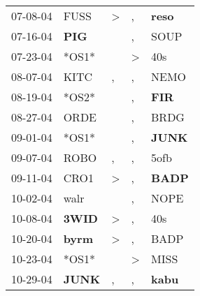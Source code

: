 \begin{supertabular}{p{0.07\textwidth}p{0.06\textwidth}p{0.02\textwidth}p{0.02\textwidth}p{0.06\textwidth}}
          07-08-04\textsuperscript{} &           FUSS\textsuperscript{} &     \textgreater &                , &  \textbf{reso\textsuperscript{}} \\
          07-16-04\textsuperscript{} &   \textbf{PIG\textsuperscript{}} &                  &                , &           SOUP\textsuperscript{} \\
          07-23-04\textsuperscript{} &                            *OS1* &                  &     \textgreater &            40s\textsuperscript{} \\
          08-07-04\textsuperscript{} &           KITC\textsuperscript{} &                , &                , &           NEMO\textsuperscript{} \\
          08-19-04\textsuperscript{} &                            *OS2* &                  &                , &   \textbf{FIR\textsuperscript{}} \\
          08-27-04\textsuperscript{} &           ORDE\textsuperscript{} &                  &                , &           BRDG\textsuperscript{} \\
          09-01-04\textsuperscript{} &                            *OS1* &                  &                , &  \textbf{JUNK\textsuperscript{}} \\
          09-07-04\textsuperscript{} &           ROBO\textsuperscript{} &                , &                , &           5ofb\textsuperscript{} \\
          09-11-04\textsuperscript{} &           CRO1\textsuperscript{} &     \textgreater &                , &  \textbf{BADP\textsuperscript{}} \\
          10-02-04\textsuperscript{} &           walr\textsuperscript{} &                  &                , &           NOPE\textsuperscript{} \\
          10-08-04\textsuperscript{} &  \textbf{3WID\textsuperscript{}} &     \textgreater &                , &            40s\textsuperscript{} \\
          10-20-04\textsuperscript{} &  \textbf{byrm\textsuperscript{}} &     \textgreater &                , &           BADP\textsuperscript{} \\
          10-23-04\textsuperscript{} &                            *OS1* &                  &     \textgreater &           MISS\textsuperscript{} \\
          10-29-04\textsuperscript{} &  \textbf{JUNK\textsuperscript{}} &                , &                , &  \textbf{kabu\textsuperscript{}} \\

\end{supertabular}
